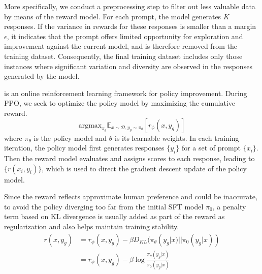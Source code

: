 More specifically, we conduct a preprocessing step to filter out less valuable data by means of the reward model. For each prompt, the model generates $K$ responses. If the variance in rewards for these responses is smaller than a margin $\epsilon$, it indicates that the prompt offers limited opportunity for exploration and improvement against the current model, and is therefore removed from the training dataset. Consequently, the final training dataset includes only those instances where significant variation and diversity are observed in the responses generated by the model.

 is an online reinforcement learning framework for policy improvement. %
During PPO, we seek to optimize the policy model by maximizing the cumulative reward. 
\begin{equation}
    \mathrm{argmax}_{\pi_{\theta}} \mathbb{E}_{x\sim \mathcal{D},y_g\sim \pi_{\theta}}[r_\phi(x,y_g)]
\end{equation}
where $\pi_{\theta}$ is the policy model and $\theta$ is its learnable weights.  
In each training iteration, the policy model first generates responses $\{y_{i}\}$ for a set of prompt $\{x_i\}$. Then the reward model evaluates and assigns scores to each response, leading to $\{r(x_i,y_i)\}$, which is used to direct the gradient descent update of the policy model. 

Since the reward reflects approximate human preference and could be inaccurate, to avoid the policy diverging too far from the initial SFT model $\pi_0$, a penalty term based on KL divergence is usually added as part of the reward as regularization and also helps maintain training stability. 
\begin{equation}
    \begin{split}
    r(x, y_g) &= r_\phi(x,y_g) - \beta D_{KL}(\pi_{\theta}(y_g|x) || \pi_{0}(y_g|x)) \\
    &= r_\phi(x, y_g) - \beta \log \frac{\pi_{\theta}(y_g|x)}{\pi_{0}(y_g|x)}
    \end{split}
\end{equation}

